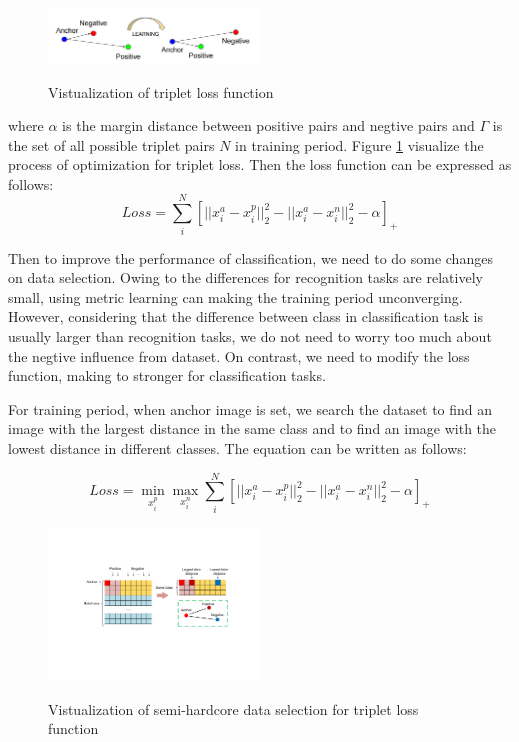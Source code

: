 \documentclass[10pt,twocolumn,letterpaper]{article}
\begin{document}
\begin{figure}
\centering
\includegraphics[width = 0.5\textwidth]{triplet.png}
\label{triplet}
\caption{Vistualization of triplet loss function}
\end{figure}

where $\alpha$ is the margin distance between positive pairs and negtive pairs and $\Gamma$ is the set of all possible triplet pairs $N$ in training period. Figure \ref{triplet} visualize the process of optimization for triplet loss. Then the loss function can be expressed as follows:
$$Loss = \sum_{i}^N [||x_i^a - x_i^p||_2^2  - ||x_i^a - x_i^n||_2^2 - \alpha]_+$$

Then to improve the performance of classification, we need to do some changes on data selection. Owing to the differences for recognition tasks are relatively small, using metric learning can making the training period unconverging. However,  considering that the difference between class in classification task is usually larger than recognition tasks, we do not need to worry too much about the negtive influence from dataset. On contrast, we need to modify the loss function, making to stronger for classification tasks.

For training period, when anchor image is set, we search the dataset to find an image  with the largest distance in the same class and to find an image with the lowest distance in different classes. The equation can be written as follows:

$$Loss = \min_{x_i^p}\max_{x_i^n} \sum_{i}^N [||x_i^a - x_i^p||_2^2  - ||x_i^a - x_i^n||_2^2 - \alpha]_+$$

\begin{figure}
\centering
\includegraphics[width = 0.5\textwidth]{improve.pdf}
\label{improved}
\caption{Vistualization of semi-hardcore data selection for triplet loss function}
\end{figure}
\end{document}
